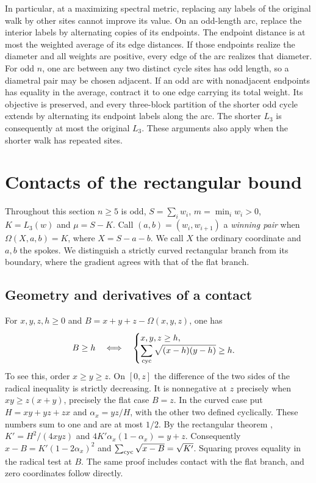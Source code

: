 \documentclass[11pt,a4paper]{article}
\theoremstyle{definition}
\begin{document}
In particular, at a maximizing spectral metric, replacing any labels of the original walk by other sites cannot improve its value. On an odd-length arc, replace the interior labels by alternating copies of its endpoints. The endpoint distance is at most the weighted average of its edge distances. If those endpoints realize the diameter and all weights are positive, every edge of the arc realizes that diameter. For odd \(n\), one arc between any two distinct cycle sites has odd length, so a diametral pair may be chosen adjacent. If an odd arc with nonadjacent endpoints has equality in the average, contract it to one edge carrying its total weight. Its objective is preserved, and every three-block partition of the shorter odd cycle extends by alternating its endpoint labels along the arc. The shorter \(L_3\) is consequently at most the original \(L_3\). These arguments also apply when the shorter walk has repeated sites.

\section{Contacts of the rectangular bound}\label{sec:contacts}

Throughout this section $n\ge5$ is odd, $S=\sum_i w_i$, $m=\min_iw_i>0$,
$K=L_3(w)$ and $\mu=S-K$. Call $(a,b)=(w_i,w_{i+1})$ a
\emph{winning pair} when $\Omega(X,a,b)=K$, where $X=S-a-b$. We call
$X$ the ordinary coordinate and $a,b$ the spokes. We distinguish a
strictly curved rectangular branch from its boundary, where the gradient
agrees with that of the flat branch.

\subsection{Geometry and derivatives of a contact}

For $x,y,z,h\ge0$ and $B=x+y+z-\Omega(x,y,z)$, one has
\begin{equation}\label{eq:contact-deficit}
 B\ge h\quad\Longleftrightarrow\quad
 \begin{cases}
 x,y,z\ge h,\\
 \displaystyle\sum_{\rm cyc}\sqrt{(x-h)(y-h)}\ge h .
 \end{cases}
\end{equation}
To see this, order $x\ge y\ge z$. On $[0,z]$ the difference of the two
sides of the radical inequality is strictly decreasing. It is nonnegative
at $z$ precisely when $xy\ge z(x+y)$, precisely the flat case $B=z$.
In the curved case put $H=xy+yz+zx$ and $\alpha_x=yz/H$, with the
other two defined cyclically. These numbers sum to one and are at most
$1/2$. By the rectangular theorem \cite{Rect}, $K'=H^2/(4xyz)$ and
$4K'\alpha_x(1-\alpha_x)=y+z$. Consequently
$x-B=K'(1-2\alpha_x)^2$ and $\sum_{\rm cyc}\sqrt{x-B}=\sqrt{K'}$.
Squaring proves equality in the radical test at $B$. The same proof
includes contact with the flat branch, and zero coordinates follow directly.
\end{document}

